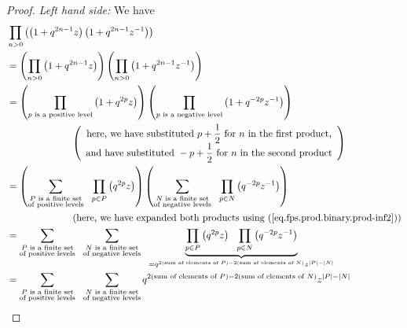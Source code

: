 \begin{proof}
\textit{Left hand side:} We have%
\begin{align}
&  \prod_{n>0}\left(  \left(  1+q^{2n-1}z\right)  \left(  1+q^{2n-1}%
z^{-1}\right)  \right) \nonumber\\
&  =\left(  \prod_{n>0}\left(  1+q^{2n-1}z\right)  \right)  \left(
\prod_{n>0}\left(  1+q^{2n-1}z^{-1}\right)  \right) \nonumber\\
&  =\left(  \prod_{p\text{ is a positive level}}\left(  1+q^{2p}z\right)
\right)  \left(  \prod_{p\text{ is a negative level}}\left(  1+q^{-2p}%
z^{-1}\right)  \right) \nonumber\\
&  \ \ \ \ \ \ \ \ \ \ \ \ \ \ \ \ \ \ \ \ \left(
\begin{array}
[c]{c}%
\text{here, we have substituted }p+\dfrac{1}{2}\text{ for }n\text{ in the
first product,}\\
\text{and have substituted }-p+\dfrac{1}{2}\text{ for }n\text{ in the second
product}%
\end{array}
\right) \nonumber\\
&  =\left(  \sum_{\substack{P\text{ is a finite set}\\\text{of positive
levels}}}\ \ \prod_{p\in P}\left(  q^{2p}z\right)  \right)  \left(
\sum_{\substack{N\text{ is a finite set}\\\text{of negative levels}}%
}\ \ \prod_{p\in N}\left(  q^{-2p}z^{-1}\right)  \right) \nonumber\\
&  \ \ \ \ \ \ \ \ \ \ \ \ \ \ \ \ \ \ \ \ \left(  \text{here, we have
expanded both products using (\ref{eq.fps.prod.binary.prod-inf2})}\right)
\nonumber\\
&  =\sum_{\substack{P\text{ is a finite set}\\\text{of positive levels}%
}}\ \ \sum_{\substack{N\text{ is a finite set}\\\text{of negative levels}%
}}\ \ \underbrace{\prod_{p\in P}\left(  q^{2p}z\right)  \ \ \prod_{p\in
N}\left(  q^{-2p}z^{-1}\right)  }_{=q^{2\left(  \text{sum of elements of
}P\right)  -2\left(  \text{sum of elements of }N\right)  }z^{\left\vert
P\right\vert -\left\vert N\right\vert }}\nonumber\\
&  =\sum_{\substack{P\text{ is a finite set}\\\text{of positive levels}%
}}\ \ \sum_{\substack{N\text{ is a finite set}\\\text{of negative levels}%
}}q^{2\left(  \text{sum of elements of }P\right)  -2\left(  \text{sum of
elements of }N\right)  }z^{\left\vert P\right\vert -\left\vert N\right\vert
}\nonumber\\

\end{align}
\end{proof}
